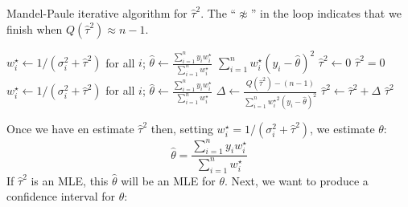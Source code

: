 \documentclass[letterpaper,12pt]{article}
\begin{document}
\begin{enumerate}
\begin{algorithm}[htbp]
  \caption{Mandel-Paule iterative algorithm for $\hat\tau^2$. The ``$\not\approx$'' in the loop indicates that we finish when $Q(\hat\tau^2)\approx n-1$.}\label{alg:mp}
  \smaller
  \begin{algorithmic}
    \State $w_i^\star\gets 1/(\sigma_i^2+\hat\tau^2)$ for all $i$; $\hat\theta\gets\frac{\sum_{i=1}^ny_iw_i^\star}{\sum_{i=1}^nw_i^\star}$
    \State\Return $\sum_{i=1}^n{w_i^\star(y_i-\hat\theta)^2}$
    \EndProcedure
    \hrulefill
    \State $\hat\tau^2 \gets 0$
     \Return $\hat\tau^2=0$
    \EndIf
      \State $w_i^\star\gets 1/(\sigma_i^2+\hat\tau^2)$ for all $i$; $\hat\theta\gets\frac{\sum_{i=1}^ny_iw_i^\star}{\sum_{i=1}^nw_i^\star}$
      \State $\Delta\gets\frac{Q(\hat\tau^2)-(n-1)}{\sum_{i=1}^n{w_i^\star}^2(y_i-\hat\theta)^2}$
      \State $\hat\tau^2\gets\hat\tau^2+\Delta$
    \EndWhile
    \State\Return $\hat\tau^2$
  \end{algorithmic}
  \end{algorithm}
\end{enumerate}
Once we have en estimate $\hat\tau^2$ then, setting $w_i^\star=1/(\sigma_i^2+\hat\tau^2)$, we estimate $\theta$:
\begin{equation}
  \hat\theta=\frac{\sum_{i=1}^ny_iw_i^\star}{\sum_{i=1}^nw_i^\star}
\end{equation}
If $\hat\tau^2$ is an MLE, this $\hat\theta$ will be an MLE for $\theta$. Next, we want to produce a confidence interval for $\theta$:
\end{document}
